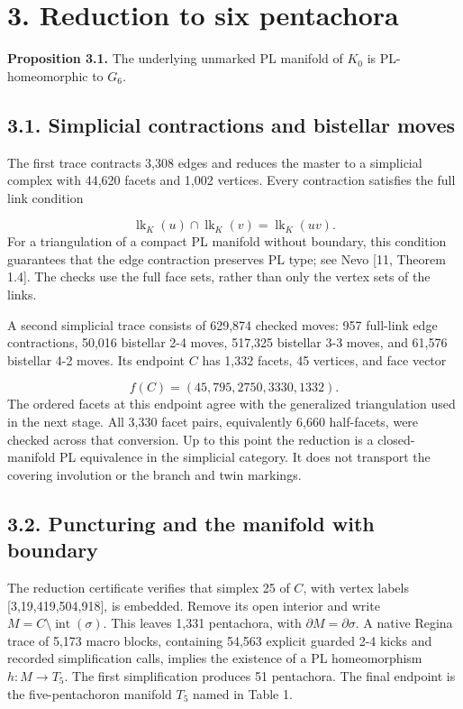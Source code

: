 \documentclass[11pt,letterpaper]{article}
\begin{document}
\section*{3. Reduction to six pentachora}
\medskip\noindent\textbf{Proposition 3.1.} The underlying unmarked PL manifold of $K_0$ is PL-homeomorphic to $G_6$.

\subsection*{3.1. Simplicial contractions and bistellar moves}
The first trace contracts 3,308 edges and reduces the master to a simplicial complex with 44,620 facets and 1,002 vertices. Every contraction satisfies the full link condition

\[
\operatorname{lk}_{K}(u)\cap\operatorname{lk}_{K}(v)=\operatorname{lk}_{K}(uv).
\]
For a triangulation of a compact PL manifold without boundary, this condition guarantees that the edge contraction preserves PL type; see Nevo [11, Theorem 1.4]. The checks use the full face sets, rather than only the vertex sets of the links.

A second simplicial trace consists of 629,874 checked moves: 957 full-link edge contractions, 50,016 bistellar 2-4 moves, 517,325 bistellar 3-3 moves, and 61,576 bistellar 4-2 moves. Its endpoint $C$ has 1,332 facets, 45 vertices, and face vector

\[
f(C)=(45,795,2750,3330,1332).
\]
The ordered facets at this endpoint agree with the generalized triangulation used in the next stage. All 3,330 facet pairs, equivalently 6,660 half-facets, were checked across that conversion. Up to this point the reduction is a closed-manifold PL equivalence in the simplicial category. It does not transport the covering involution or the branch and twin markings.

\subsection*{3.2. Puncturing and the manifold with boundary}
The reduction certificate verifies that simplex 25 of $C$, with vertex labels [3,19,419,504,918], is embedded. Remove its open interior and write $M=C\setminus\operatorname{int}(\sigma)$. This leaves 1,331 pentachora, with $\partial M=\partial\sigma$. A native Regina trace of 5,173 macro blocks, containing 54,563 explicit guarded 2-4 kicks and recorded simplification calls, implies the existence of a PL homeomorphism $h:M\longrightarrow T_5$. The first simplification produces 51 pentachora. The final endpoint is the five-pentachoron manifold $T_5$ named in Table 1.
\end{document}
